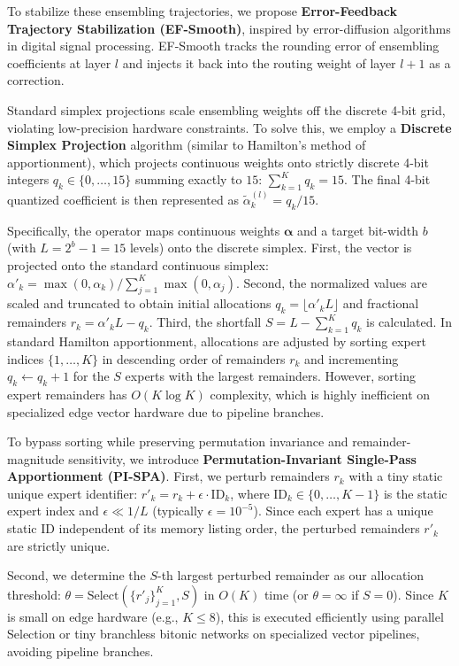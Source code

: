 To stabilize these ensembling trajectories, we propose \textbf{Error-Feedback Trajectory Stabilization (EF-Smooth)}, inspired by error-diffusion algorithms in digital signal processing. EF-Smooth tracks the rounding error of ensembling coefficients at layer $l$ and injects it back into the routing weight of layer $l+1$ as a correction.

Standard simplex projections scale ensembling weights off the discrete 4-bit grid, violating low-precision hardware constraints. To solve this, we employ a \textbf{Discrete Simplex Projection} algorithm (similar to Hamilton's method of apportionment), which projects continuous weights onto strictly discrete 4-bit integers $q_k \in \{0, \dots, 15\}$ summing exactly to $15$: $\sum_{k=1}^K q_k = 15$. The final 4-bit quantized coefficient is then represented as $\tilde{\alpha}_{k}^{(l)} = q_k / 15$. 

Specifically, the  operator maps continuous weights $\boldsymbol{\alpha}$ and a target bit-width $b$ (with $L = 2^b - 1 = 15$ levels) onto the discrete simplex. First, the vector is projected onto the standard continuous simplex: $\alpha'_k = \max(0, \alpha_k) / \sum_{j=1}^K \max(0, \alpha_j)$. Second, the normalized values are scaled and truncated to obtain initial allocations $q_k = \lfloor \alpha'_k L \rfloor$ and fractional remainders $r_k = \alpha'_k L - q_k$. Third, the shortfall $S = L - \sum_{k=1}^K q_k$ is calculated. In standard Hamilton apportionment, allocations are adjusted by sorting expert indices $\{1, \dots, K\}$ in descending order of remainders $r_k$ and incrementing $q_k \leftarrow q_k + 1$ for the $S$ experts with the largest remainders. However, sorting expert remainders has $O(K \log K)$ complexity, which is highly inefficient on specialized edge vector hardware due to pipeline branches. 

To bypass sorting while preserving permutation invariance and remainder-magnitude sensitivity, we introduce \textbf{Permutation-Invariant Single-Pass Apportionment (PI-SPA)}. First, we perturb remainders $r_k$ with a tiny static unique expert identifier: $r'_k = r_k + \epsilon \cdot \text{ID}_k$, where $\text{ID}_k \in \{0, \dots, K-1\}$ is the static expert index and $\epsilon \ll 1/L$ (typically $\epsilon = 10^{-5}$). Since each expert has a unique static ID independent of its memory listing order, the perturbed remainders $r'_k$ are strictly unique.

Second, we determine the $S$-th largest perturbed remainder as our allocation threshold: $\theta = \text{Select}\left(\{r'_j\}_{j=1}^K, S\right)$ in $O(K)$ time (or $\theta = \infty$ if $S=0$). Since $K$ is small on edge hardware (e.g., $K \le 8$), this is executed efficiently using parallel Selection or tiny branchless bitonic networks on specialized vector pipelines, avoiding pipeline branches.

